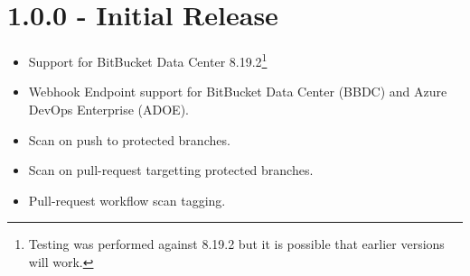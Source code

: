 \section{1.0.0 - Initial Release}
    \begin{itemize}
        \item Support for BitBucket Data Center 8.19.2\footnote{Testing was performed against 8.19.2 but it is possible that earlier versions will work.}
        \item Webhook Endpoint support for BitBucket Data Center (BBDC) and Azure DevOps Enterprise (ADOE).
        \item Scan on push to protected branches.
        \item Scan on pull-request targetting protected branches.
        \item Pull-request workflow scan tagging.
    \end{itemize}